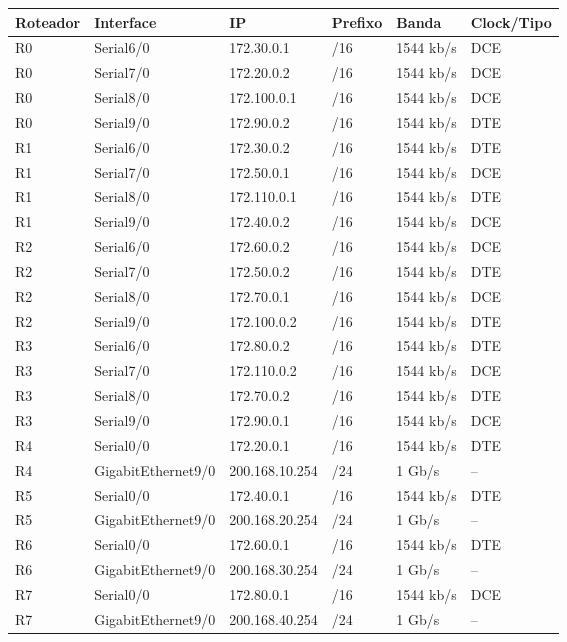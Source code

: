 \begin{tabular}{llllll}
\toprule
Roteador & Interface & IP & Prefixo & Banda & Clock/Tipo\\
\midrule
R0 & Serial6/0 & 172.30.0.1 & /16 & 1544 kb/s & DCE\\
R0 & Serial7/0 & 172.20.0.2 & /16 & 1544 kb/s & DCE\\
R0 & Serial8/0 & 172.100.0.1 & /16 & 1544 kb/s & DCE\\
R0 & Serial9/0 & 172.90.0.2 & /16 & 1544 kb/s & DTE\\
\midrule
R1 & Serial6/0 & 172.30.0.2 & /16 & 1544 kb/s & DTE\\
R1 & Serial7/0 & 172.50.0.1 & /16 & 1544 kb/s & DCE\\
R1 & Serial8/0 & 172.110.0.1 & /16 & 1544 kb/s & DTE\\
R1 & Serial9/0 & 172.40.0.2 & /16 & 1544 kb/s & DCE\\
\midrule
R2 & Serial6/0 & 172.60.0.2 & /16 & 1544 kb/s & DCE\\
R2 & Serial7/0 & 172.50.0.2 & /16 & 1544 kb/s & DTE\\
R2 & Serial8/0 & 172.70.0.1 & /16 & 1544 kb/s & DCE\\
R2 & Serial9/0 & 172.100.0.2 & /16 & 1544 kb/s & DTE\\
\midrule
R3 & Serial6/0 & 172.80.0.2 & /16 & 1544 kb/s & DTE\\
R3 & Serial7/0 & 172.110.0.2 & /16 & 1544 kb/s & DCE\\
R3 & Serial8/0 & 172.70.0.2 & /16 & 1544 kb/s & DTE\\
R3 & Serial9/0 & 172.90.0.1 & /16 & 1544 kb/s & DCE\\
\midrule
R4 & Serial0/0 & 172.20.0.1 & /16 & 1544 kb/s & DTE\\
R4 & GigabitEthernet9/0 & 200.168.10.254 & /24 & 1 Gb/s & --\\
\midrule
R5 & Serial0/0 & 172.40.0.1 & /16 & 1544 kb/s & DTE\\
R5 & GigabitEthernet9/0 & 200.168.20.254 & /24 & 1 Gb/s & --\\
\midrule
R6 & Serial0/0 & 172.60.0.1 & /16 & 1544 kb/s & DTE\\
R6 & GigabitEthernet9/0 & 200.168.30.254 & /24 & 1 Gb/s & --\\
\midrule
R7 & Serial0/0 & 172.80.0.1 & /16 & 1544 kb/s & DCE\\
R7 & GigabitEthernet9/0 & 200.168.40.254 & /24 & 1 Gb/s & --\\
\bottomrule
\end{tabular}
